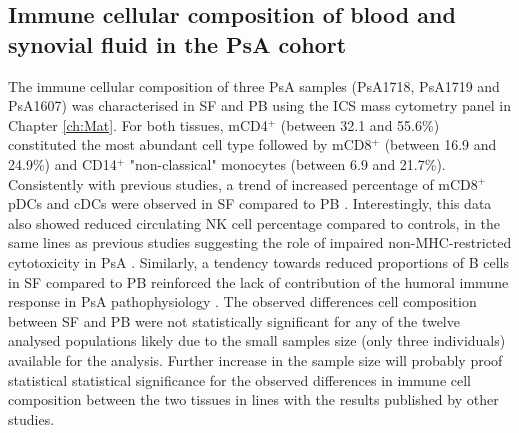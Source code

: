 \subsection{Immune cellular composition of blood and synovial fluid in the PsA cohort}
The immune cellular composition of three PsA samples (PsA1718, PsA1719 and PsA1607) was characterised in SF and PB using the ICS mass cytometry panel in Chapter \ref{ch:Mat}. For both tissues, mCD4$^+$ (between 32.1 and 55.6\%) constituted the most abundant cell type followed by mCD8$^+$ (between 16.9 and 24.9\%) and CD14$^+$ "non-classical" monocytes (between 6.9 and 21.7\%). Consistently with previous studies, a trend of increased percentage of mCD8$^+$ pDCs and cDCs were observed in SF compared to PB \parencite{Ross2000,Jongbloed2006}. Interestingly, this data also showed reduced circulating NK cell percentage compared to controls, in the same lines as previous studies suggesting the role of impaired non-MHC-restricted cytotoxicity in PsA \parencite{Spadaro2014}. Similarly, a tendency towards reduced proportions of B cells  in SF compared to PB reinforced the lack of contribution of the humoral immune response in PsA pathophysiology \parencite{}. The observed differences cell composition between SF and PB were not statistically significant for any of the twelve analysed populations likely due to the small samples size (only three individuals) available for the analysis. Further increase in the sample size will probably proof statistical statistical significance for the observed differences in immune cell composition between the two tissues in lines with the results published by other studies.   

